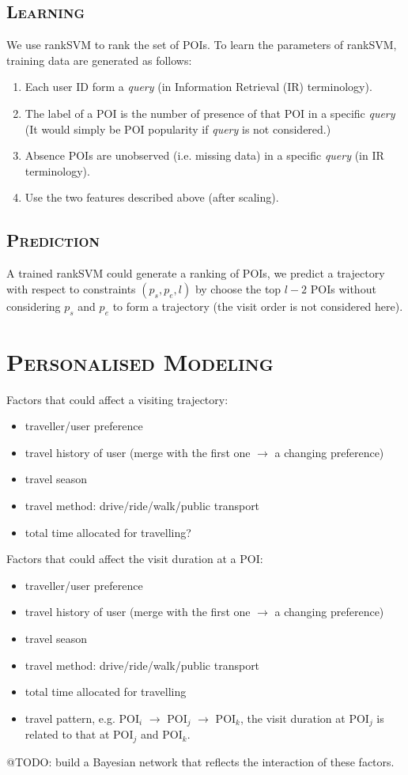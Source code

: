 \documentclass[11pt, a4paper]{article}
\begin{document}
\subsection{\textsc{Learning}}
We use rankSVM\cite{herbrich99} to rank the set of POIs.
To learn the parameters of rankSVM,
training data are generated as follows:
\begin{enumerate}
\item Each user ID form a \textit{query} (in Information Retrieval (IR) terminology). 
\item The label of a POI is the number of presence of that POI in a specific \textit{query} 
      (It would simply be POI popularity if \textit{query} is not considered.)
\item Absence POIs are unobserved (i.e. missing data) in a specific \textit{query} (in IR terminology).
\item Use the two features described above (after scaling).
\end{enumerate}

\subsection{\textsc{Prediction}}
A trained rankSVM could generate a ranking of POIs, we predict a trajectory with respect to constraints
$(p_s, p_e, l)$ by choose the top $l-2$ POIs without considering 
$p_s$ and $p_e$ to form a trajectory (the visit order is not considered here).


\section{\textsc{Personalised Modeling}}
Factors that could affect a visiting trajectory:
\begin{itemize}
\item traveller/user preference
\item travel history of user (merge with the first one $\to$ a changing preference)
\item travel season
\item travel method: drive/ride/walk/public transport
\item total time allocated for travelling?
\end{itemize}
Factors that could affect the visit duration at a POI:
\begin{itemize}
\item traveller/user preference
\item travel history of user (merge with the first one $\to$ a changing preference)
\item travel season
\item travel method: drive/ride/walk/public transport
\item total time allocated for travelling
\item travel pattern, e.g. POI$_i$ $\to$ POI$_j$ $\to$ POI$_k$, 
      the visit duration at POI$_j$ is related to that at POI$_j$ and POI$_k$.
\end{itemize}
@TODO: build a Bayesian network that reflects the interaction of these factors.
\end{document}
